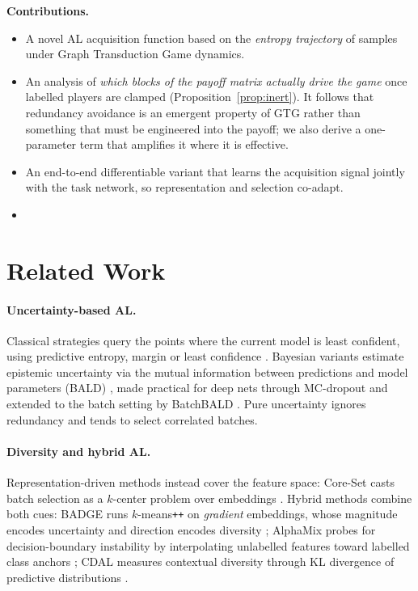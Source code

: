 \documentclass[11pt]{article}
\begin{document}
\noindent\textbf{Contributions.}
\begin{itemize}
  \item A novel AL acquisition function based on the \emph{entropy trajectory} of
        samples under Graph Transduction Game dynamics.
  \item An analysis of \emph{which blocks of the payoff matrix actually drive the
        game} once labelled players are clamped (Proposition~\ref{prop:inert}). It
        follows that redundancy avoidance is an emergent property of GTG rather than
        something that must be engineered into the payoff; we also derive a
        one-parameter term that amplifies it where it is effective.
  \item An end-to-end differentiable variant that learns the acquisition signal
        jointly with the task network, so representation and selection co-adapt.
  \item %
\end{itemize}

\section{Related Work}

\paragraph{Uncertainty-based AL.} Classical strategies query the points where the
current model is least confident, using predictive entropy, margin or least
confidence \citep{settles2009active}. Bayesian variants estimate epistemic
uncertainty via the mutual information between predictions and model parameters
(BALD) \citep{houlsby2011bayesian}, made practical for deep nets through MC-dropout
\citep{gal2017deep} and extended to the batch setting by BatchBALD
\citep{kirsch2019batchbald}. Pure uncertainty ignores redundancy and tends to
select correlated batches.

\paragraph{Diversity and hybrid AL.} Representation-driven methods instead cover
the feature space: Core-Set casts batch selection as a $k$-center problem over
embeddings \citep{sener2018active}. Hybrid methods combine both cues: BADGE runs
$k$-means\texttt{++} on \emph{gradient} embeddings, whose magnitude encodes
uncertainty and direction encodes diversity \citep{ash2020deep}; AlphaMix probes
for decision-boundary instability by interpolating unlabelled features toward
labelled class anchors \citep{parvaneh2022active}; CDAL measures contextual
diversity through KL divergence of predictive distributions \citep{agarwal2020contextual}.
\end{document}
